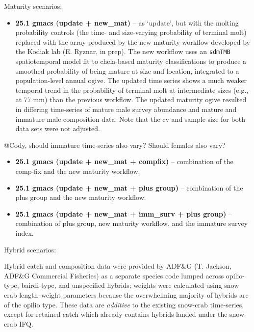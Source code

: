 \documentclass[
]{article}
\providecommand{\tightlist}{%
  \setlength{\itemsep}{0pt}\setlength{\parskip}{0pt}}
\begin{document}
Maturity scenarios:

\begin{itemize}
\tightlist
\item
  \textbf{25.1 gmacs (update + new\_mat)} -- as `update', but with the molting probability controls (the time- and size-varying probability of terminal molt) replaced with the array produced by the new maturity workflow developed by the Kodiak lab (E. Ryznar, in prep). The new workflow uses an \texttt{sdmTMB} spatiotemporal model fit to chela-based maturity classifications to produce a smoothed probability of being mature at size and location, integrated to a population-level annual ogive. The updated time series shows a much weaker temporal trend in the probability of terminal molt at intermediate sizes (e.g., at 77 mm) than the previous workflow. The updated maturity ogive resulted in differing time-series of mature male survey abundance and mature and immature male composition data. Note that the cv and sample size for both data sets were not adjusted.
\end{itemize}

@Cody, should immature time-series also vary? Should females also vary?

\begin{itemize}
\item
  \textbf{25.1 gmacs (update + new\_mat + compfix)} -- combination of the comp-fix and the new maturity workflow.
\item
  \textbf{25.1 gmacs (update + new\_mat + plus group)} -- combination of the plus group and the new maturity workflow.
\item
  \textbf{25.1 gmacs (update + new\_mat + imm\_surv + plus group)} -- combination of plus group, new maturity workflow, and the immature survey index.
\end{itemize}

Hybrid scenarios:

Hybrid catch and composition data were provided by ADF\&G (T. Jackson, ADF\&G Commercial Fisheries) as a separate species code lumped across opilio-type, bairdi-type, and unspecified hybrids; weights were calculated using snow crab length--weight parameters because the overwhelming majority of hybrids are of the opilio type. These data are \emph{additive} to the existing snow-crab time-series, except for retained catch which already contains hybrids landed under the snow-crab IFQ.
\end{document}
